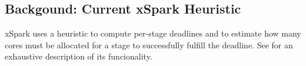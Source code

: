 \subsection{Backgound: Current xSpark Heuristic}\label{sec:impl_background}

xSpark uses a heuristic to compute per-stage deadlines and to estimate how many cores must be allocated for a stage to successfully fulfill the deadline. See  for an exhaustive description of its funcionality.


